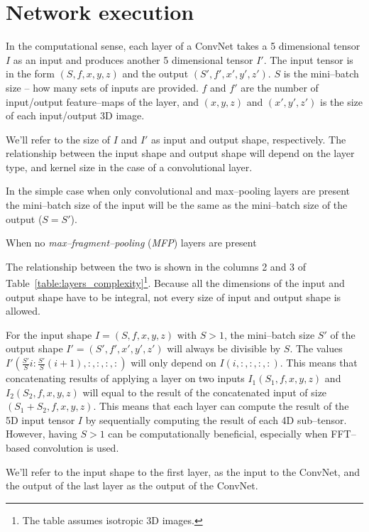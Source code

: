 \documentclass[conference]{IEEEtran}
\begin{document}
\section{Network execution}

  In the computational sense, each layer of a ConvNet takes a 5
  dimensional tensor $I$ as an input and produces another 5
  dimensional tensor $I'$.  The input tensor is in the form
  $(S,f,x,y,z)$ and the output $(S',f',x',y',z')$.  $S$ is the
  mini--batch size -- how many sets of inputs are provided.  $f$ and
  $f'$ are the number of input/output feature--maps of the layer, and
  $(x,y,z)$ and $(x',y',z')$ is the size of each input/output 3D
  image.

  We'll refer to the size of $I$ and $I'$ as input and output shape,
  respectively.  The relationship between the input shape and output
  shape will depend on the layer type, and kernel size in the case of
  a convolutional layer.

  In the simple case when only convolutional and max--pooling layers
  are present the mini--batch size of the input will be the same as
  the mini--batch size of the output ($S = S'$).

  When no \emph{max--fragment--pooling} (\emph{MFP}) layers are
  present

  The relationship between the two is shown in
  the columns 2 and 3 of
  Table~\ref{table:layers_complexity}\footnote{The table assumes
    isotropic 3D images.}.  Because all the dimensions of the input
  and output shape have to be integral, not every size of input and
  output shape is allowed.

  For the input shape $I = (S,f,x,y,z)$ with $S > 1$, the mini--batch
  size $S'$ of the output shape $I' = (S',f',x',y',z')$ will always be
  divisible by $S$.  The values $I'(\frac{S'}{S} i : \frac{S'}{S}
  (i+1),:,:,:,:)$ will only depend on $I(i,:,:,:,:)$.  This means that
  concatenating results of applying a layer on two inputs
  $I_1(S_1,f,x,y,z)$ and $I_2(S_2,f,x,y,z)$ will equal to the result
  of the concatenated input of size $(S_1+S_2,f,x,y,z)$.  This means
  that each layer can compute the result of the 5D input tensor $I$ by
  sequentially computing the result of each 4D sub--tensor.  However,
  having $S > 1$ can be computationally beneficial, especially when
  FFT--based convolution is used.

  We'll refer to the input shape to the first layer, as the input to
  the ConvNet, and the output of the last layer as the output of the
  ConvNet.
\end{document}
